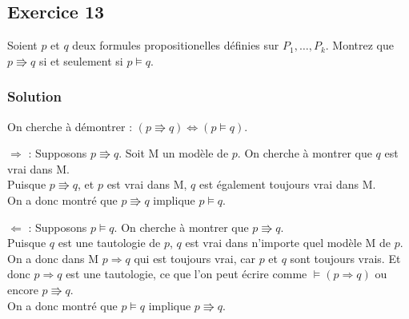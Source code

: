 \subsection*{Exercice 13}
Soient $p$ et $q$ deux formules propositionelles définies sur $P_1, \ldots, P_k$.
Montrez que $p \Rrightarrow q$ si et seulement si $p \models q$.


\subsubsection*{Solution}

    \noindent On cherche à démontrer : $(p \Rrightarrow q) \Leftrightarrow (p \models q)$.

    \noindent $\Rightarrow$ :
    Supposons $p \Rrightarrow q$.
    Soit M un modèle de $p$.
    On cherche à montrer que $q$ est vrai dans M.\\
    Puisque $p \Rrightarrow q$, et $p$ est vrai dans M, $q$ est également toujours vrai dans M.\\
    On a donc montré que $p \Rrightarrow q$ implique $p \models q$.

    \noindent $\Leftarrow$ :
    Supposons $p \models q$.
    On cherche à montrer que $p \Rrightarrow q$.\\
    Puisque $q$ est une tautologie de $p$, $q$ est vrai dans n'importe quel modèle M de $p$.
    On a donc dans M $p \Rightarrow q$ qui est toujours vrai, car $p$ et $q$ sont toujours vrais.
    Et donc $p \Rightarrow q$ est une tautologie, ce que l'on peut écrire comme $\models (p \Rightarrow q)$ ou encore $p \Rrightarrow q$.\\
    On a donc montré que $p \models q$ implique $p \Rrightarrow q$.

